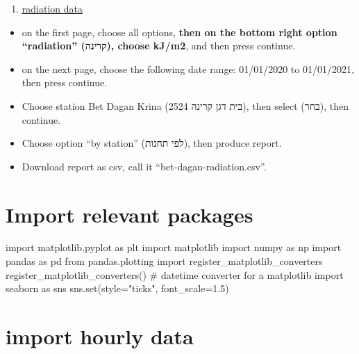 \documentclass[
  letterpaper,
  DIV=11,
  numbers=noendperiod]{scrreprt}
\newenvironment{Shaded}{\begin{snugshade}}{\end{snugshade}}
\newcommand{\BuiltInTok}[1]{\textcolor[rgb]{0.00,0.23,0.31}{#1}}
\newcommand{\CommentTok}[1]{\textcolor[rgb]{0.37,0.37,0.37}{#1}}
\newcommand{\FloatTok}[1]{\textcolor[rgb]{0.68,0.00,0.00}{#1}}
\newcommand{\ImportTok}[1]{\textcolor[rgb]{0.00,0.46,0.62}{#1}}
\newcommand{\NormalTok}[1]{\textcolor[rgb]{0.00,0.23,0.31}{#1}}
\newcommand{\OperatorTok}[1]{\textcolor[rgb]{0.37,0.37,0.37}{#1}}
\newcommand{\StringTok}[1]{\textcolor[rgb]{0.13,0.47,0.30}{#1}}
\providecommand{\tightlist}{%
  \setlength{\itemsep}{0pt}\setlength{\parskip}{0pt}}\usepackage{longtable,booktabs,array}
\begin{document}
\begin{enumerate}
\def\labelenumi{\arabic{enumi}.}
\setcounter{enumi}{2}
\tightlist
\item
  \href{https://ims.data.gov.il/he/ims/6}{radiation data}
\end{enumerate}

\begin{itemize}
\tightlist
\item
  on the first page, choose all options, \textbf{then on the bottom
  right option ``radiation'' (קרינה), choose kJ/m2}, and then press
  continue.
\item
  on the next page, choose the following date range: 01/01/2020 to
  01/01/2021, then press continue.
\item
  Choose station Bet Dagan Krina (בית דגן קרינה 2524), then select
  (בחר), then continue.
\item
  Choose option ``by station'' (לפי תחנות), then produce report.
\item
  Download report as csv, call it ``bet-dagan-radiation.csv''.
\end{itemize}

\hypertarget{import-relevant-packages}{%
\section{Import relevant packages}\label{import-relevant-packages}}

\begin{Shaded}
\begin{Highlighting}[]
\ImportTok{import}\NormalTok{ matplotlib.pyplot }\ImportTok{as}\NormalTok{ plt}
\ImportTok{import}\NormalTok{ matplotlib}
\ImportTok{import}\NormalTok{ numpy }\ImportTok{as}\NormalTok{ np}
\ImportTok{import}\NormalTok{ pandas }\ImportTok{as}\NormalTok{ pd}
\ImportTok{from}\NormalTok{ pandas.plotting }\ImportTok{import}\NormalTok{ register\_matplotlib\_converters}
\NormalTok{register\_matplotlib\_converters()  }\CommentTok{\# datetime converter for a matplotlib}
\ImportTok{import}\NormalTok{ seaborn }\ImportTok{as}\NormalTok{ sns}
\NormalTok{sns.}\BuiltInTok{set}\NormalTok{(style}\OperatorTok{=}\StringTok{"ticks"}\NormalTok{, font\_scale}\OperatorTok{=}\FloatTok{1.5}\NormalTok{)}
\end{Highlighting}
\end{Shaded}

\hypertarget{import-hourly-data}{%
\section{import hourly data}\label{import-hourly-data}}
\end{document}
